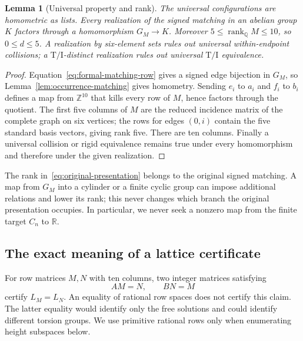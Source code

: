 \documentclass[11pt]{article}
\newtheorem{lemma}[theorem]{Lemma}
\theoremstyle{remark}
\newcommand{\Z}{\mathbb Z}
\newcommand{\R}{\mathbb R}
\newcommand{\TI}{\mathrm{T/I}}
\newcommand{\rank}{\operatorname{rank}}
\begin{document}
\begin{lemma}[Universal property and rank]\label{lem:universal-property}
The universal configurations are homometric as lists. Every realization
of the signed matching in an abelian group $K$ factors through a
homomorphism $G_M\to K$. Moreover $5\le\rank_{\mathbb Q}M\le10$, so
$0\le d\le5$. A realization by six-element sets rules out universal
within-endpoint collisions; a $\TI$-distinct realization rules out
universal $\TI$ equivalence.
\end{lemma}
\begin{proof}
Equation~\eqref{eq:formal-matching-row} gives a signed edge bijection in
$G_M$, so Lemma~\ref{lem:occurrence-matching} gives homometry. Sending
$e_i$ to $a_i$ and $f_i$ to $b_i$ defines a map from $\Z^{10}$ that kills
every row of $M$, hence factors through the quotient. The first five
columns of $M$ are the reduced incidence matrix of the complete graph
on six vertices; the rows for edges $(0,i)$ contain the five standard
basis vectors, giving rank five. There are ten columns. Finally a
universal collision or rigid equivalence remains true under every
homomorphism and therefore under the given realization.
\end{proof}

The rank in~\eqref{eq:original-presentation} belongs to the original
signed matching. A map from $G_M$ into a cylinder or a finite cyclic group
can impose additional relations and lower its rank; this never changes
which branch the original presentation occupies. In particular, we never
seek a nonzero map from the finite target $C_n$ to $\R$.

\subsection{The exact meaning of a lattice certificate}
For row matrices $M,N$ with ten columns, two integer matrices satisfying
\begin{equation}\label{eq:two-way-lattice-cert}
 AM=N,\qquad BN=M
\end{equation}
certify $L_M=L_N$. An equality of rational row spaces does not certify this
claim. The latter equality would identify only the free solutions and
could identify different torsion groups. We use primitive rational rows
only when enumerating height subspaces below.
\end{document}
